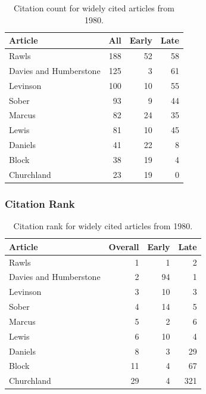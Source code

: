 \documentclass[
  10pt,
  letterpaper,
  DIV=11,
  numbers=noendperiod,
  twoside]{scrartcl}
\begin{document}
\begin{longtable}[]{@{}lrrr@{}}

\caption{\label{tbl-citation-count-1980}Citation count for widely cited
articles from 1980.}

\tabularnewline

\toprule\noalign{}
Article & All & Early & Late \\
\midrule\noalign{}
\endhead
\bottomrule\noalign{}
\endlastfoot
Rawls & 188 & 52 & 58 \\
Davies and Humberstone & 125 & 3 & 61 \\
Levinson & 100 & 10 & 55 \\
Sober & 93 & 9 & 44 \\
Marcus & 82 & 24 & 35 \\
Lewis & 81 & 10 & 45 \\
Daniels & 41 & 22 & 8 \\
Block & 38 & 19 & 4 \\
Churchland & 23 & 19 & 0 \\

\end{longtable}

\subsubsection*{Citation Rank}\label{citation-rank-4}

\begin{longtable}[]{@{}lrrr@{}}

\caption{\label{tbl-citation-rank-1980}Citation rank for widely cited
articles from 1980.}

\tabularnewline

\toprule\noalign{}
Article & Overall & Early & Late \\
\midrule\noalign{}
\endhead
\bottomrule\noalign{}
\endlastfoot
Rawls & 1 & 1 & 2 \\
Davies and Humberstone & 2 & 94 & 1 \\
Levinson & 3 & 10 & 3 \\
Sober & 4 & 14 & 5 \\
Marcus & 5 & 2 & 6 \\
Lewis & 6 & 10 & 4 \\
Daniels & 8 & 3 & 29 \\
Block & 11 & 4 & 67 \\
Churchland & 29 & 4 & 321 \\

\end{longtable}
\end{document}
